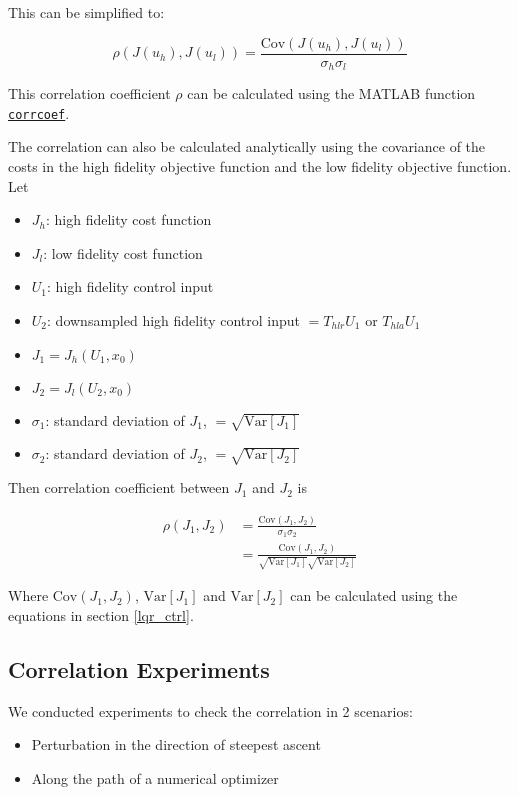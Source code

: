 \documentclass{article}
\begin{document}
This can be simplified to:

\begin{equation}
  \rho(J(u_h), J(u_l)) = \frac{\text{Cov}(J(u_h), J(u_l))}{\sigma_h \sigma_l}
\end{equation}

This correlation coefficient $\rho$ can be calculated using the MATLAB function \href{https://www.mathworks.com/help/matlab/ref/corrcoef.html#bunkaln}{\texttt{corrcoef}}.

The correlation can also be calculated analytically using the covariance of the costs in the high fidelity objective function and the low fidelity objective function.
Let

\begin{itemize}
  \item $J_h$: high fidelity cost function
  \item $J_l$: low fidelity cost function
  \item $U_1$: high fidelity control input
  \item $U_2$: downsampled high fidelity control input $= T_{hlr} U_1$ or $T_{hla} U_1$
  \item $J_1 = J_h(U_1, x_0)$
  \item $J_2 = J_l(U_2, x_0)$
  \item $\sigma_1$: standard deviation of $J_1$, $=\sqrt{\text{Var}[J_1]}$
  \item $\sigma_2$: standard deviation of $J_2$, $=\sqrt{\text{Var}[J_2]}$
\end{itemize}

Then correlation coefficient between $J_1$ and $J_2$ is

\begin{equation}
  \begin{aligned}
    \rho(J_1, J_2) &= \frac{\text{Cov}(J_1, J_2)}{\sigma_1 \sigma_2} \\
    &= \frac{\text{Cov}(J_1, J_2)}{\sqrt{\text{Var}[J_1]} \sqrt{\text{Var}[J_2]}}
  \end{aligned}
\end{equation}

Where $\text{Cov}(J_1, J_2)$, $\text{Var}[J_1]$ and $\text{Var}[J_2]$ can be calculated using the equations in section \ref{lqr_ctrl}.

\subsection{Correlation Experiments}

We conducted experiments to check the correlation in 2 scenarios:
\begin{itemize}
  \item Perturbation in the direction of steepest ascent
  \item Along the path of a numerical optimizer
\end{itemize}
\end{document}
